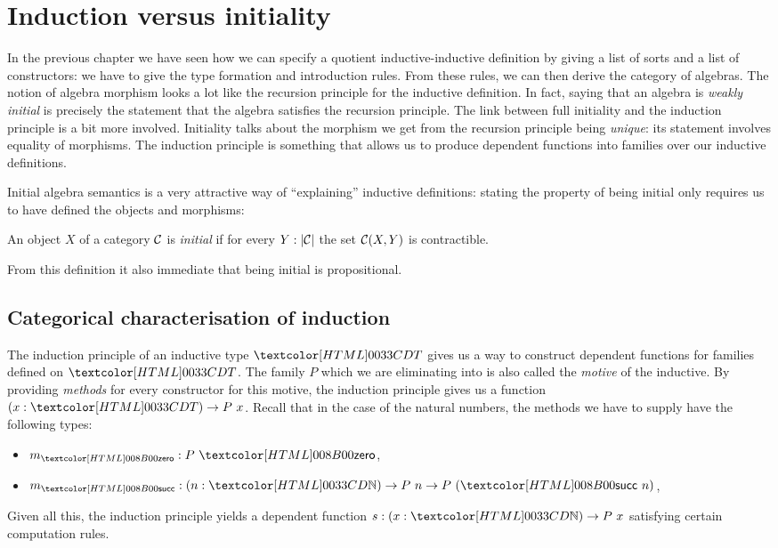 \chapter{Induction versus initiality}
\label{induction}

In the previous chapter we have seen how we can specify a quotient
inductive-inductive definition by giving a list of sorts and a list of
constructors: we have to give the type formation and introduction
rules. From these rules, we can then derive the category of
algebras. The notion of algebra morphism looks a lot like the
recursion principle for the inductive definition. In fact, saying that
an algebra is \emph{weakly initial} is precisely the statement that
the algebra satisfies the recursion principle. The link between full
initiality and the induction principle is a bit more
involved. Initiality talks about the morphism we get from the
recursion principle being \emph{unique}: its statement involves
equality of morphisms. The induction principle is something that
allows us to produce dependent functions into families over our
inductive definitions.

Initial algebra semantics is a very attractive way of ``explaining''
inductive definitions: stating the property of being initial only
requires us to have defined the objects and morphisms:

\begin{definition}[Initiality]
  An object $X$ of a category $\mathcal{C}$ is \emph{initial} if for every
  $Y : | \mathcal{C} |$ the set $\mathcal{C}(X,Y)$ is contractible.
\end{definition}

From this definition it also immediate that being initial is
propositional.

\section{Categorical characterisation of induction}

The induction principle of an inductive type $\Tty$ gives us a way to
construct dependent functions for families defined on $\Tty$. The
family $P$ which we are eliminating into is also called the
\emph{motive} of the inductive. By providing \emph{methods} for every
constructor for this motive, the induction principle gives us a
function $(x : \Tty) \to P\ x$. Recall that in the case of the natural
numbers, the methods we have to supply have the following types:
%
\begin{itemize}
\item $m_{\natzero} : P\ \natzero$,
\item $m_{\natsucc} : (n : \natty) \to P\ n \to P\ (\natsucc\ n)$,
\end{itemize}
%
Given all this, the induction principle yields a dependent function
$s : (x : \natty) \to P\ x$ satisfying certain computation rules.

